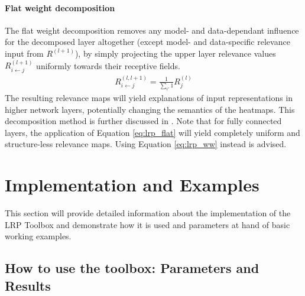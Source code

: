\documentclass[a4wide]{article}
\begin{document}
\paragraph{Flat weight decomposition}
The flat weight decomposition removes any model- and data-dependant influence for the decomposed layer altogether (except model- and data-specific relevance input from $R^{(l+1)}$), by simply projecting the upper layer relevance values $R^{(l+1)}_{i\leftarrow j}$ uniformly towards their receptive fields.
\begin{align}
R^{(l,l+1)}_{i\leftarrow j} = \frac{1}{\sum\limits_{i'} 1}R^{(l)}_{j}
\label{eq:lrp_flat}
\end{align}
The resulting relevance maps will yield explanations of input representations in higher network layers, potentially changing the semantics of the heatmaps. This decomposition method is further discussed in \cite{BacICIP16}. Note that for fully connected layers, the application of Equation \ref{eq:lrp_flat} will yield completely uniform and structure-less relevance maps. Using Equation \ref{eq:lrp_ww} instead is advised.




\section{Implementation and Examples}
\label{sec:implementation}
This section will provide detailed information about the implementation of the LRP Toolbox and demonstrate how it is used and parameters at hand of basic working examples.

\subsection*{How to use the toolbox: Parameters and Results}
\end{document}
